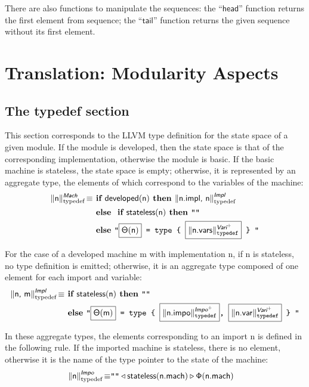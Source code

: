 \documentclass{llncs}
\newcommand{\trad}[2]{\ensuremath{\lVert \textsf{#1} \rVert^{\textit{#2}}}}
\DeclareMathOperator{\isdef}{\equiv}
\newcommand{\llvm}[1]{\texttt{#1}}
\newcommand{\B}[1]{\textsf{#1}}
\newcommand{\ListOf}[1]{$\mbox{#1}^+$}
\newcommand{\IF}[0]{\textbf{ if }}
\newcommand{\ELSE}[0]{\textbf{ else }}
\newcommand{\THEN}[0]{\textbf{ then }}
\newcommand{\PH}[1]{\framebox{$#1$}}
\newcommand{\developed}[0]{\ensuremath{\textsf{developed}}}
\newcommand{\stateless}[0]{\ensuremath{\textsf{stateless}}}
\newcommand{\state}[0]{\ensuremath{\sf\Theta}}
\newcommand{\stateref}[0]{\ensuremath{\sf\Phi}}
\begin{document}
There are also functions to manipulate the sequences: the $\B{``head''}$ function 
returns the first element from sequence; the $\B{``tail''}$ function returns 
the given sequence without its first element.

\section{Translation: Modularity Aspects}
\label{sec:module}

\subsection{The typedef section}

This section corresponds to the LLVM type definition for the state space of a
given module. If the module is developed, then the state space is that of the
corresponding implementation, otherwise the module is basic. If the basic
machine is stateless, the state space is empty; otherwise, it is represented by
an aggregate type, the elements of which correspond to the variables of the
machine:
\begin{align*}
  \trad{\B{n}}{\B{Mach}}_{\text{typedef}} \isdef
  & \IF \developed(\B{n}) \THEN \trad{\B{n.impl}, \B{n}}{\B{Impl}}_{\text{typedef}} \\
  & \ELSE \IF \stateless(\B{n}) \THEN \llvm{""} \\
  & \ELSE \llvm{"\PH{\state(\B{n})} = type \{ \PH{\trad{\B{n.vars}}{\ListOf{\B{Vari}}}_{\text{typedef}}} \} "}
\end{align*}

For the case of a developed machine \B{m} with implementation \B{n}, if \B{n} is
stateless, no type definition is emitted; otherwise, it is an aggregate type
composed of one element for each import and variable:
\begin{align*}
  \trad{\B{n}, \B{m}}{\B{Impl}}_{\text{typedef}} \isdef
  & \IF \stateless(\B{n}) \THEN \llvm{""} \\
  & \ELSE \llvm{"\PH{\state(\B{m})} = type \{ \PH{\trad{\B{n.impo}}{\ListOf{\B{Impo}}}_{\text{typedef}}}, \PH{\trad{\B{n.var}}{\ListOf{\B{Vari}}}_{\text{typedef}}} \} "}
\end{align*}

In these aggregate types, the elements corresponding to an import \B{n} is
defined in the following rule. If the imported machine is stateless, there is no
element, otherwise it is the name of the type pointer to the state of the
machine:
\begin{align*}
  \trad{\B{n}}{\B{Impo}}_{\text{typedef}} \isdef
  & \llvm{""} \triangleleft \stateless(\B{n.mach}) \triangleright \stateref(\B{n.mach})
\end{align*}
\end{document}
